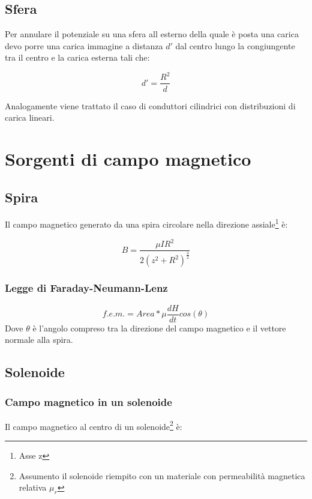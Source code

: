 \documentclass[10pt,a4paper]{report}
\begin{document}
	\section{Sfera}

	Per annulare il potenziale su una sfera all esterno della quale è posta una carica devo porre una carica immagine a distanza $d'$ dal centro lungo la congiungente tra il centro e la carica esterna tali che:

	\begin{equation}
	d'=\frac{R^2}{d}
	\end{equation}

	Analogamente viene trattato il caso di conduttori cilindrici con distribuzioni di carica lineari.

\chapter{Sorgenti di campo magnetico}

	\section{Spira}
			Il campo magnetico generato da una spira circolare nella direzione assiale\footnote{Asse z} è:

			\begin{equation}
			B=\frac{\mu IR^2}{2(z^2+R^2)^{\frac{3}{2}}}
			\end{equation}

		\subsection{Legge di Faraday-Neumann-Lenz}

		\begin{equation}
		f.e.m.=Area* \mu \frac{dH}{dt} cos(\theta) 
		\end{equation}
		Dove $\theta$ è l'angolo compreso tra la direzione del campo magnetico e il vettore normale alla spira.
	\section{Solenoide}
		\subsection{Campo magnetico in un solenoide}
			Il campo magnetico al centro di un solenoide\footnote{Assumento il solenoide riempito con un materiale con permeabilità magnetica relativa $\mu_r$} è:
\end{document}

